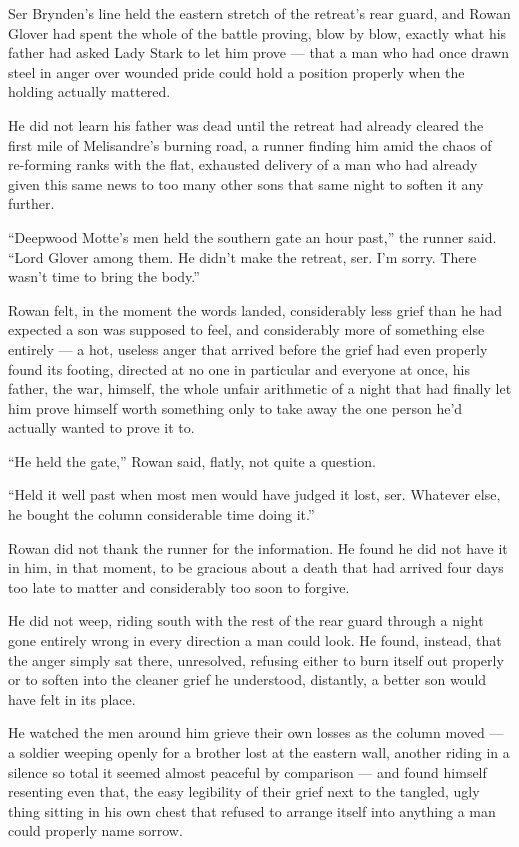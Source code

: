 Ser Brynden’s line held the eastern stretch of the retreat’s rear guard, and Rowan Glover had spent the whole of the battle proving, blow by blow, exactly what his father had asked Lady Stark to let him prove — that a man who had once drawn steel in anger over wounded pride could hold a position properly when the holding actually mattered.

He did not learn his father was dead until the retreat had already cleared the first mile of Melisandre’s burning road, a runner finding him amid the chaos of re-forming ranks with the flat, exhausted delivery of a man who had already given this same news to too many other sons that same night to soften it any further.

“Deepwood Motte’s men held the southern gate an hour past,” the runner said. “Lord Glover among them. He didn’t make the retreat, ser. I’m sorry. There wasn’t time to bring the body.”

Rowan felt, in the moment the words landed, considerably less grief than he had expected a son was supposed to feel, and considerably more of something else entirely — a hot, useless anger that arrived before the grief had even properly found its footing, directed at no one in particular and everyone at once, his father, the war, himself, the whole unfair arithmetic of a night that had finally let him prove himself worth something only to take away the one person he’d actually wanted to prove it to.

“He held the gate,” Rowan said, flatly, not quite a question.

“Held it well past when most men would have judged it lost, ser. Whatever else, he bought the column considerable time doing it.”

Rowan did not thank the runner for the information. He found he did not have it in him, in that moment, to be gracious about a death that had arrived four days too late to matter and considerably too soon to forgive.

\sceneBreak

He did not weep, riding south with the rest of the rear guard through a night gone entirely wrong in every direction a man could look. He found, instead, that the anger simply sat there, unresolved, refusing either to burn itself out properly or to soften into the cleaner grief he understood, distantly, a better son would have felt in its place.

He watched the men around him grieve their own losses as the column moved — a soldier weeping openly for a brother lost at the eastern wall, another riding in a silence so total it seemed almost peaceful by comparison — and found himself resenting even that, the easy legibility of their grief next to the tangled, ugly thing sitting in his own chest that refused to arrange itself into anything a man could properly name sorrow.

